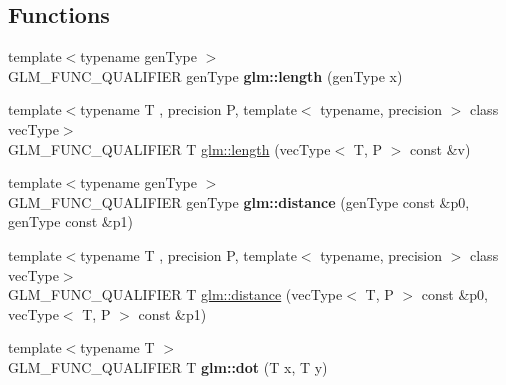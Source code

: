 \subsection*{Functions}
\begin{DoxyCompactItemize}
\item 
\hypertarget{namespaceglm_abcd8538aa95a8963803ec42c2fd654cd}{{\footnotesize template$<$typename gen\-Type $>$ }\\G\-L\-M\-\_\-\-F\-U\-N\-C\-\_\-\-Q\-U\-A\-L\-I\-F\-I\-E\-R gen\-Type {\bfseries glm\-::length} (gen\-Type x)}\label{namespaceglm_abcd8538aa95a8963803ec42c2fd654cd}

\item 
{\footnotesize template$<$typename T , precision P, template$<$ typename, precision $>$ class vec\-Type$>$ }\\G\-L\-M\-\_\-\-F\-U\-N\-C\-\_\-\-Q\-U\-A\-L\-I\-F\-I\-E\-R T \hyperlink{group__core__func__geometric_ga18d45e3d4c7705e67ccfabd99e521604}{glm\-::length} (vec\-Type$<$ T, P $>$ const \&v)
\item 
\hypertarget{namespaceglm_aa7275be4cec4bfcf1c4a7add8f3ee7f4}{{\footnotesize template$<$typename gen\-Type $>$ }\\G\-L\-M\-\_\-\-F\-U\-N\-C\-\_\-\-Q\-U\-A\-L\-I\-F\-I\-E\-R gen\-Type {\bfseries glm\-::distance} (gen\-Type const \&p0, gen\-Type const \&p1)}\label{namespaceglm_aa7275be4cec4bfcf1c4a7add8f3ee7f4}

\item 
{\footnotesize template$<$typename T , precision P, template$<$ typename, precision $>$ class vec\-Type$>$ }\\G\-L\-M\-\_\-\-F\-U\-N\-C\-\_\-\-Q\-U\-A\-L\-I\-F\-I\-E\-R T \hyperlink{group__core__func__geometric_ga7ca317dde0d7e94d920153554d4a02a8}{glm\-::distance} (vec\-Type$<$ T, P $>$ const \&p0, vec\-Type$<$ T, P $>$ const \&p1)
\item 
\hypertarget{namespaceglm_a40370edb74dec9048258c063b9c091c9}{{\footnotesize template$<$typename T $>$ }\\G\-L\-M\-\_\-\-F\-U\-N\-C\-\_\-\-Q\-U\-A\-L\-I\-F\-I\-E\-R T {\bfseries glm\-::dot} (T x, T y)}\label{namespaceglm_a40370edb74dec9048258c063b9c091c9}


\end{DoxyCompactItemize}
